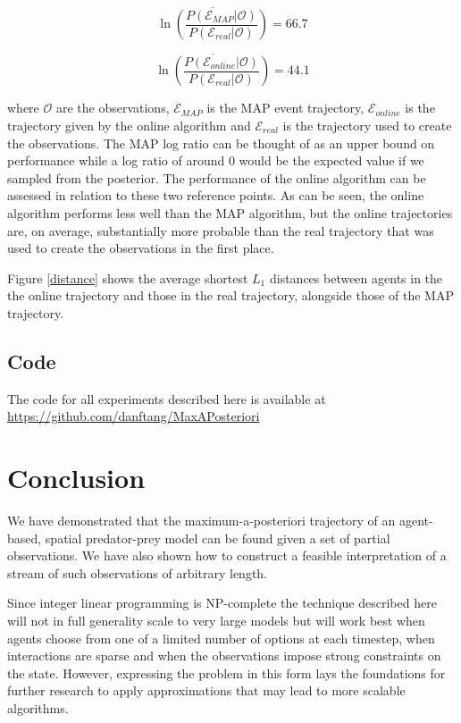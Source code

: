 \documentclass{article}
\begin{document}
\[
\overline{\ln\left(\frac{P(\mathcal{E}_{MAP}|\mathcal{O})}{P(\mathcal{E}_{real}|\mathcal{O})}\right)} = 66.7
\]

\[
\overline{\ln\left(\frac{P(\mathcal{E}_{online}|\mathcal{O})}{P(\mathcal{E}_{real}|\mathcal{O})}\right)} = 44.1
\]

where $\mathcal{O}$ are the observations, $\mathcal{E}_{MAP}$ is the MAP event trajectory, $\mathcal{E}_{online}$ is the trajectory given by the online algorithm and $\mathcal{E}_{real}$ is the trajectory used to create the observations. The MAP log ratio can be thought of as an upper bound on performance while a log ratio of around 0 would be the expected value if we sampled from the posterior. The performance of the online algorithm can be assessed in relation to these two reference points. As can be seen, the online algorithm performs less well than the MAP algorithm, but the online trajectories are, on average, substantially more probable than the real trajectory that was used to create the observations in the first place. 

Figure \ref{distance} shows the average shortest $L_1$ distances between agents in the the online trajectory and those in the real trajectory, alongside those of the MAP trajectory.

\subsection{Code}

The code for all experiments described here is available at \href{https://github.com/danftang/MaxAPosteriori}{https://github.com/danftang/MaxAPosteriori}

\section{Conclusion}

We have demonstrated that the maximum-a-posteriori trajectory of an agent-based, spatial predator-prey model can be found given a set of partial observations. We have also shown how to construct a feasible interpretation of a stream of such observations of arbitrary length.

Since integer linear programming is NP-complete the technique described here will not in full generality scale to very large models but will work best when agents choose from one of a limited number of options at each timestep, when interactions are sparse and when the observations impose strong constraints on the state. However, expressing the problem in this form lays the foundations for further research to apply approximations that may lead to more scalable algorithms.
\end{document}
